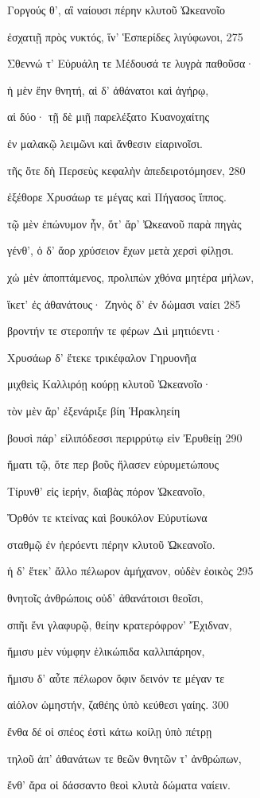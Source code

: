 Γοργούς θ', αἳ ναίουσι πέρην κλυτοῦ Ὠκεανοῖο

ἐσχατιῇ πρὸς νυκτός, ἵν' Ἑσπερίδες λιγύφωνοι, \num{275}

Σθεννώ τ' Εὐρυάλη τε Μέδουσά τε λυγρὰ παθοῦσα· 

ἡ μὲν ἔην θνητή, αἱ δ' ἀθάνατοι καὶ ἀγήρῳ, 

αἱ δύο· τῇ δὲ μιῇ παρελέξατο Κυανοχαίτης 

ἐν μαλακῷ λειμῶνι καὶ ἄνθεσιν εἰαρινοῖσι. 

τῆς ὅτε δὴ Περσεὺς κεφαλὴν ἀπεδειροτόμησεν, \num{280} 

ἐξέθορε Χρυσάωρ τε μέγας καὶ Πήγασος ἵππος.

τῷ μὲν ἐπώνυμον ἦν, ὅτ' ἄρ' Ὠκεανοῦ παρὰ πηγὰς

γένθ', ὁ δ' ἄορ χρύσειον ἔχων μετὰ χερσὶ φίλῃσι. 

χὠ μὲν ἀποπτάμενος, προλιπὼν χθόνα μητέρα μήλων,

ἵκετ' ἐς ἀθανάτους· Ζηνὸς δ' ἐν δώμασι ναίει \num{285} 

βροντήν τε στεροπήν τε φέρων Διὶ μητιόεντι·

Χρυσάωρ δ' ἔτεκε τρικέφαλον Γηρυονῆα

μιχθεὶς Καλλιρόῃ κούρῃ κλυτοῦ Ὠκεανοῖο· 

τὸν μὲν ἄρ' ἐξενάριξε βίη Ἡρακληείη

βουσὶ πάρ' εἰλιπόδεσσι περιρρύτῳ εἰν Ἐρυθείῃ \num{290}

ἤματι τῷ, ὅτε περ βοῦς ἤλασεν εὐρυμετώπους 

Τίρυνθ' εἰς ἱερήν, διαβὰς πόρον Ὠκεανοῖο, 

Ὄρθόν τε κτείνας καὶ βουκόλον Εὐρυτίωνα

σταθμῷ ἐν ἠερόεντι πέρην κλυτοῦ Ὠκεανοῖο.

ἡ δ' ἔτεκ' ἄλλο πέλωρον ἀμήχανον, οὐδὲν ἐοικὸς \num{295} 

θνητοῖς ἀνθρώποις οὐδ' ἀθανάτοισι θεοῖσι, 

σπῆι ἔνι γλαφυρῷ, θείην κρατερόφρον' Ἔχιδναν, 

ἥμισυ μὲν νύμφην ἑλικώπιδα καλλιπάρηον, 

ἥμισυ δ' αὖτε πέλωρον ὄφιν δεινόν τε μέγαν τε

αἰόλον ὠμηστήν, ζαθέης ὑπὸ κεύθεσι γαίης. \num{300} 

ἔνθα δέ οἱ σπέος ἐστὶ κάτω κοίλῃ ὑπὸ πέτρῃ

τηλοῦ ἀπ' ἀθανάτων τε θεῶν θνητῶν τ' ἀνθρώπων,

ἔνθ' ἄρα οἱ δάσσαντο θεοὶ κλυτὰ δώματα ναίειν.

